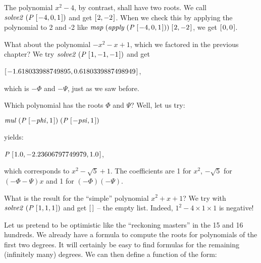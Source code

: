 \documentclass[tikz]{scrreprt}
\newcommand{\Conid}[1]{\mathit{#1}}
\newcommand{\Varid}[1]{\mathit{#1}}
\begin{document}
The polynomial $x^2 - 4$, by contrast,
shall have two roots. We call
\ensuremath{\Varid{solve2}\;(\Conid{P}\;[\mskip1.5mu \mathbin{-}\mathrm{4},\mathrm{0},\mathrm{1}\mskip1.5mu])} and get \ensuremath{[\mskip1.5mu \mathrm{2},\mathbin{-}\mathrm{2}\mskip1.5mu]}.
When we check this by applying the polynomial
to 2 and -2 like \ensuremath{\Varid{map}\;(\Varid{apply}\;(\Conid{P}\;[\mskip1.5mu \mathbin{-}\mathrm{4},\mathrm{0},\mathrm{1}\mskip1.5mu]))\;[\mskip1.5mu \mathrm{2},\mathbin{-}\mathrm{2}\mskip1.5mu]},
we get \ensuremath{[\mskip1.5mu \mathrm{0},\mathrm{0}\mskip1.5mu]}.

What about the polynomial $-x^2 - x + 1$, which
we factored in the previous chapter?
We try \ensuremath{\Varid{solve2}\;(\Conid{P}\;[\mskip1.5mu \mathrm{1},\mathbin{-}\mathrm{1},\mathbin{-}\mathrm{1}\mskip1.5mu])} and get

\ensuremath{[\mskip1.5mu \mathbin{-}\mathrm{1.618033988749895},\mathrm{0.6180339887498949}\mskip1.5mu]},

which is $-\Phi$ and $-\Psi$, just as we saw before.

Which polynomial has the roots $\Phi$ and $\Psi$?
Well, let us try:

\ensuremath{\Varid{mul}\;(\Conid{P}\;[\mskip1.5mu \mathbin{-}\Varid{phi},\mathrm{1}\mskip1.5mu])\;(\Conid{P}\;[\mskip1.5mu \mathbin{-}\Varid{psi},\mathrm{1}\mskip1.5mu])}

yields: 

\ensuremath{\Conid{P}\;[\mskip1.5mu \mathrm{1.0},\mathbin{-}\mathrm{2.23606797749979},\mathrm{1.0}\mskip1.5mu]},

which corresponds to $x^2 -\sqrt{5} + 1$.
The coefficients are
1 for $x^2$, $-\sqrt{5}$ for $(-\Phi-\Psi)x$
and 1 for $(-\Phi)(-\Psi)$.

What is the result for the ``simple''
polynomial $x^2 + x + 1$?
We try with \ensuremath{\Varid{solve2}\;(\Conid{P}\;[\mskip1.5mu \mathrm{1},\mathrm{1},\mathrm{1}\mskip1.5mu])} and get
\ensuremath{[\mskip1.5mu \mskip1.5mu]} -- the empty list.
Indeed, $1^2 - 4\times 1\times 1$ is negative!

Let us pretend to be optimistic like the ``reckoning masters''
in the 15 and 16 hundreds. We already have a formula to compute
the roots for polynomials of the first two degrees.
It will certainly be easy to find formulas for the remaining
(infinitely many) degrees. We can then define a function
of the form:
\end{document}

